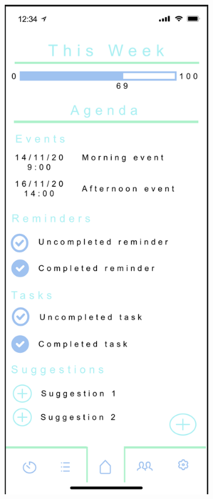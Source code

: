 \begin{figure}[H]
    \centering
    \begin{subfigure}[b]{0.3\textwidth}
        \centering
        \includegraphics[width=\textwidth]{./graphics/design/Dashboard - Agenda View - This Week.png}

\end{subfigure}
\end{figure}
